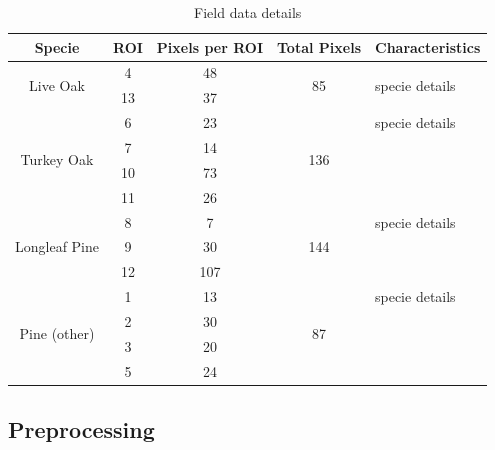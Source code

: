 \documentclass[remotesensing,article,accept,moreauthors,pdftex,12pt,a4paper]{mdpi}
\begin{document}

\begin{table}
\begin{center}

    \begin{tabular}{ | c | c | c | c | l | }
    \hline
    Specie & ROI & Pixels per ROI & Total Pixels & Characteristics \\
    \hline
    \multirow{2}{*}{Live Oak} & 4  & 48 & \multirow{2}{*}{85} & \multirow{2}{*}{specie details} \\ 
 & 13 & 37 & & \\    
    \hline
    \multirow{4}{*}{Turkey Oak} & 6 & 23 &\multirow{4}{*}{136} & specie details \\ 
     & 7 & 14 & & \\    
     & 10 & 73 &  & \\    
     & 11 & 26 & & \\    
    \hline
    \multirow{3}{*}{Longleaf Pine} & 8 & 7 & \multirow{3}{*}{144} & specie details \\ 
     & 9 & 30 &  & \\    
     & 12 & 107 & & \\
     \hline
    \multirow{4}{*}{Pine (other)} & 1 & 13 & \multirow{4}{*}{87} & specie details \\
     & 2 & 30 & & \\    
     & 3 & 20 &  & \\    
     & 5 & 24 & & \\
    \hline
    
    \end{tabular}
    \caption{Field data details}
    \label{table:field data}
    \end{center}

\end{table}








\subsection{Preprocessing}
\end{document}
